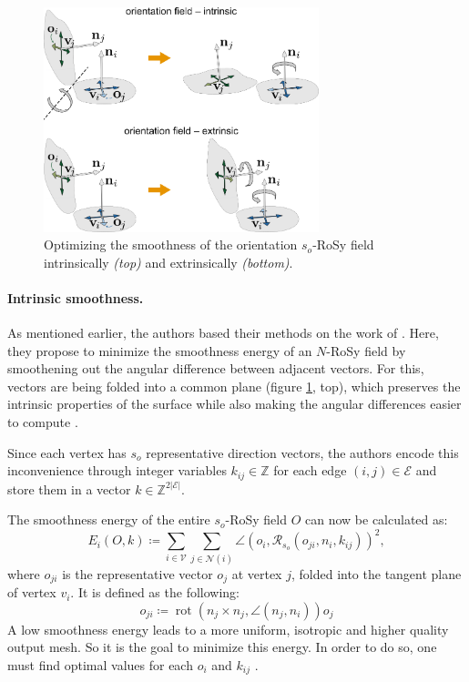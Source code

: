 \documentclass{ACGSeminar}
\DeclareMathOperator{\rot}{rot}
\begin{document}
\begin{figure}[htb!]
	\begin{centering}
		\includegraphics[width=8cm]{img/orientation-field-intrinsic-extrinsic.png}\par
	\end{centering}
	\caption{Optimizing the smoothness of the orientation $s_o$-RoSy field intrinsically \textit{(top)} and extrinsically \textit{(bottom)}. \cite{jakob2015instant}}
	\label{fig:orientation-field-intrinsic-extrinsic}
\end{figure}

\paragraph{Intrinsic smoothness.}
As mentioned earlier, the authors based their methods on the work of \cite{ray2008n,bommes2009mixed}. Here, they propose to minimize the smoothness energy of an $N$-RoSy field by smoothening out the angular difference between adjacent vectors. For this, vectors are being folded into a common plane (figure \ref{fig:orientation-field-intrinsic-extrinsic}, top), which preserves the intrinsic properties of the surface while also making the angular differences easier to compute \cite{jakob2015instant}.\bigskip

Since each vertex has $s_o$ representative direction vectors, the authors encode this inconvenience through integer variables $k_{ij} \in \mathbb{Z}$ for each edge $(i,j) \in \mathcal{E}$ and store them in a vector $k \in \mathbb{Z}^{2 \vert \mathcal{E} \vert}$.

The smoothness energy of the entire $s_o$-RoSy field $O$ can now be calculated as:
\begin{equation}\label{eq:orientation-isotropic-energy}
	E_i(O,k) \coloneqq \sum_{i \in \mathcal{V}} \sum_{j \in \mathcal{N}(i)} \angle(o_i, \mathcal{R}_{s_o}(o_{ji}, n_i, k_{ij}))^2,
\end{equation}
where $o_{ji}$ is the representative vector $o_j$ at vertex $j$, folded into the tangent plane of vertex $v_i$. It is defined as the following:
\begin{equation*}
	o_{ji} \coloneqq \rot(n_j \times n_j, \angle(n_j, n_i))o_j
\end{equation*}
A low smoothness energy leads to a more uniform, isotropic and higher quality output mesh. So it is the goal to minimize this energy. In order to do so, one must find optimal values for each $o_i$ and $k_{ij}$ \cite{jakob2015instant}.\bigskip
\end{document}
